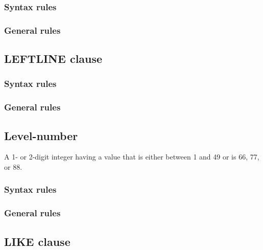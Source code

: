 \subsubsection{Syntax rules}

\subsubsection{General rules}

\subsection{LEFTLINE clause}

\begin{syntax}[\miscextcolour]
\end{syntax}

\subsubsection{Syntax rules}

\subsubsection{General rules}

\subsection{Level-number}

A 1- or 2-digit integer having a value that is either between 1 and 49 or is 66, 77,  or 88.

\subsubsection{Syntax rules}

\subsubsection{General rules}

\subsection{LIKE clause}

\begin{syntax}[\miscextcolour]
\end{syntax}

